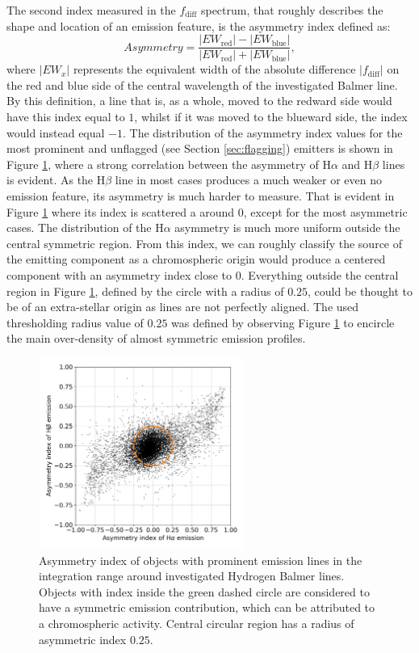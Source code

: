 The second index measured in the $f_\mathrm{diff}$ spectrum, that roughly describes the shape and location of an emission feature, is the asymmetry index defined as:
\begin{equation}
\label{equ:hab_asym}
Asymmetry = \frac{|EW_\mathrm{red}| - |EW_\mathrm{blue}|}{|EW_\mathrm{red}| + |EW_\mathrm{blue}|},
\end{equation}
where $|EW_x|$ represents the equivalent width of the absolute difference $|f_\mathrm{diff}|$ on the red and blue side of the central wavelength of the investigated Balmer line. By this definition, a line that is, as a whole, moved to the redward side would have this index equal to $1$, whilst if it was moved to the blueward side, the index would instead equal $-1$. The distribution of the asymmetry index values for the most prominent and unflagged (see Section \ref{sec:flagging}) emitters is shown in Figure \ref{fig:hab_asym}, where a strong correlation between the asymmetry of H$\alpha$ and H$\beta$ lines is evident. As the H$\beta$ line in most cases produces a much weaker or even no emission feature, its asymmetry is much harder to measure. That is evident in Figure \ref{fig:hab_asym} where its index is scattered a around $0$, except for the most asymmetric cases. The distribution of the H$\alpha$ asymmetry is much more uniform outside the central symmetric region. From this index, we can roughly classify the source of the emitting component as a chromospheric origin would produce a centered component with an asymmetry index close to $0$. Everything outside the central region in Figure \ref{fig:hab_asym}, defined by the circle with a radius of $0.25$, could be thought to be of an extra-stellar origin as lines are not perfectly aligned. The used thresholding radius value of $0.25$ was defined by observing Figure \ref{fig:hab_asym} to encircle the main over-density of almost symmetric emission profiles.

\begin{figure}
	\centering
	\includegraphics[width=0.6\textwidth]{H_emission_asymmetry.png}
	\caption{Asymmetry index of objects with prominent emission lines in the integration range around investigated Hydrogen Balmer lines. Objects with index inside the green dashed circle are considered to have a symmetric emission contribution, which can be attributed to a chromospheric activity. Central circular region has a radius of asymmetric index $0.25$.}
	\label{fig:hab_asym}
\end{figure}

